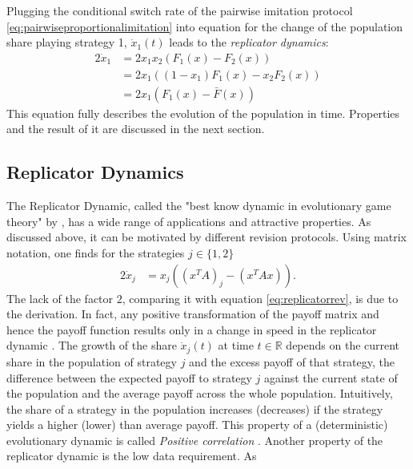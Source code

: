 \documentclass[11pt]{article}
\newcommand{\realnumb}{\mathbb{R}}
\begin{document}
Plugging the conditional switch rate of the pairwise imitation protocol 
\eqref{eq:pairwiseproportionalimitation} into equation for the change 
of the population share playing strategy 1, $\dot{x}_1(t)$ leads to the 
\textit{replicator dynamics}:
\begin{alignat*}{2}
        \label{eq:replicatorrev}
        \dot{x}_1 &= 2 x_1 x_2 (F_1(x) - F_2(x)) \\
                  &= 2 x_1 ((1-x_1) F_1(x) - x_2 F_2(x)) \\
                  &= 2 x_1 (F_1(x) - \bar{F}(x)) 
\end{alignat*}
This equation fully describes the evolution of the population in time.
Properties and the result of it are discussed in the next section.

\subsection{Replicator Dynamics}
\label{sec:replicatordynamic}
The Replicator Dynamic, called the "best know dynamic in
evolutionary game theory" by \textcite{sandholm_population_2010}, has a wide 
range of applications and attractive properties. 
As discussed above, it can be 
motivated by different revision protocols. Using matrix notation, one finds 
for the strategies $j \in \{1,2\}$
\begin{alignat}{2}
        \dot{x}_j &= x_j\left(\left(x^T A\right)_j -
                \left(x^T A x\right)\right). 
        \label{eq:replicator}
\end{alignat}
The lack of the factor $2$, comparing it with equation 
\eqref{eq:replicatorrev}, is due to the derivation. In fact, any
positive transformation of the payoff matrix and hence the payoff function
results only in a change in speed in the replicator dynamic
\parencite[73]{weibull_evolutionary_1997}.
The growth of the share $\dot{x}_j(t)$ at time $t \in \realnumb$ depends 
on the current share in the population of strategy $j$ and the 
excess payoff of that strategy, the difference between the expected 
payoff to strategy $j$ against the current state of the population and the
average payoff across the whole population.
Intuitively, the share of a strategy in the population increases (decreases) 
if the strategy yields a higher (lower) than average payoff. 
This property of a (deterministic) evolutionary dynamic is called 
\textit{Positive correlation} \parencite{sandholm_population_2010}. 
Another property of the replicator dynamic is the low data requirement. As 
\end{document}
